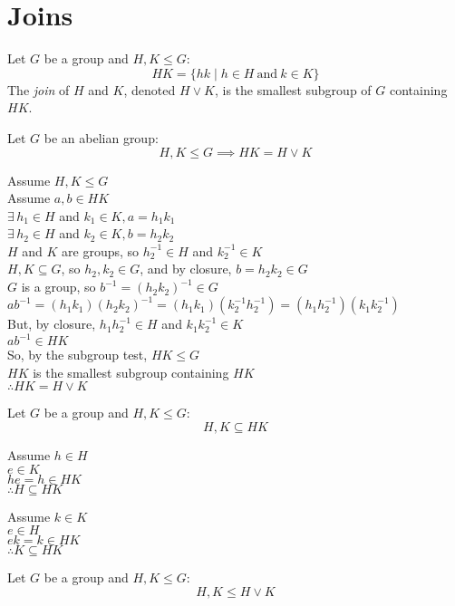 \documentclass[letterpaper,12pt,fleqn]{article}
\begin{document}
\section*{Joins}

\begin{definition}
  Let $G$ be a group and $H,K\le G$:
  \[HK=\{hk\mid h\in H\ \mbox{and}\ k\in K\}\]
  The \emph{join} of $H$ and $K$, denoted $H\vee K$, is the smallest subgroup
  of $G$ containing $HK$.
\end{definition}

\begin{theorem}
  Let $G$ be an abelian group:
  \[H,K\le G\implies HK=H\vee K\]
\end{theorem}

\begin{theproof}
  Assume $H,K\le G$ \\
  Assume $a,b\in HK$ \\
  $\exists\,h_1\in H$ and $k_1\in K,a=h_1k_1$ \\
  $\exists\,h_2\in H$ and $k_2\in K,b=h_2k_2$ \\
  $H$ and $K$ are groups, so $h_2^{-1}\in H$ and $k_2^{-1}\in K$ \\
  $H,K\subseteq G$, so $h_2,k_2\in G$, and by closure, $b=h_2k_2\in G$ \\
  $G$ is a group, so $b^{-1}=(h_2k_2)^{-1}\in G$ \\
  $ab^{-1}=(h_1k_1)(h_2k_2)^{-1}=(h_1k_1)(k_2^{-1}h_2^{-1})=
  (h_1h_2^{-1})(k_1k_2^{-1})$ \\
  But, by closure, $h_1h_2^{-1}\in H$ and $k_1k_2^{-1}\in K$ \\
  $ab^{-1}\in HK$ \\
  So, by the subgroup test, $HK\le G$ \\
  $HK$ is the smallest subgroup containing $HK$ \\
  $\therefore HK=H\vee K$
\end{theproof}

\begin{theorem}
  Let $G$ be a group and $H,K\le G$:
  \[H,K\subseteq HK\]
\end{theorem}

\begin{theproof}
  \begin{minipage}[t]{2in}
    Assume $h\in H$ \\
    $e\in K$ \\
    $he=h\in HK$ \\
    $\therefore H\subseteq HK$
  \end{minipage}
  \begin{minipage}[t]{2in}
    Assume $k\in K$ \\
    $e\in H$ \\
    $ek=k\in HK$ \\
    $\therefore K\subseteq HK$
  \end{minipage}
\end{theproof}
\newpage
\begin{corollary}
  Let $G$ be a group and $H,K\le G$:
  \[H,K\le H\vee K\]
\end{corollary}
\end{document}

